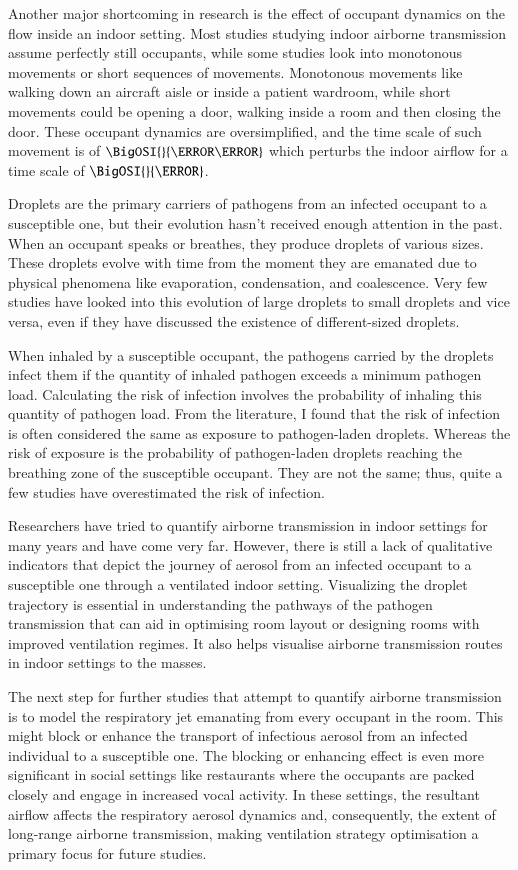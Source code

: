 \documentclass[a4paper,12pt]{elsarticle}
\begin{document}
Another major shortcoming in research is the effect of occupant dynamics on the flow inside an indoor setting. Most studies studying indoor airborne transmission assume perfectly still occupants, while some studies look into monotonous movements or short sequences of movements. Monotonous movements like walking down an aircraft aisle or inside a patient wardroom, while short movements could be opening a door, walking inside a room and then closing the door. These occupant dynamics are oversimplified, and the time scale of such movement is of $\BigOSI{}{\milli\second}$ which perturbs the indoor airflow for a time scale of $\BigOSI{}{\second}$.

Droplets are the primary carriers of pathogens from an infected occupant to a susceptible one, but their evolution hasn't received enough attention in the past. When an occupant speaks or breathes, they produce droplets of various sizes. These droplets evolve with time from the moment they are emanated due to physical phenomena like evaporation, condensation, and coalescence. Very few studies have looked into this evolution of large droplets to small droplets and vice versa, even if they have discussed the existence of different-sized droplets.

When inhaled by a susceptible occupant, the pathogens carried by the droplets infect them if the quantity of inhaled pathogen exceeds a minimum pathogen load. Calculating the risk of infection involves the probability of inhaling this quantity of pathogen load. From the literature, I found that the risk of infection is often considered the same as exposure to pathogen-laden droplets. Whereas the risk of exposure is the probability of pathogen-laden droplets reaching the breathing zone of the susceptible occupant. They are not the same; thus, quite a few studies have overestimated the risk of infection.

Researchers have tried to quantify airborne transmission in indoor settings for many years and have come very far. However, there is still a lack of qualitative indicators that depict the journey of aerosol from an infected occupant to a susceptible one through a ventilated indoor setting. Visualizing the droplet trajectory is essential in understanding the pathways of the pathogen transmission that can aid in optimising room layout or designing rooms with improved ventilation regimes. It also helps visualise airborne transmission routes in indoor settings to the masses.

The next step for further studies that attempt to quantify airborne transmission is to model the respiratory jet emanating from every occupant in the room. This might block or enhance the transport of infectious aerosol from an infected individual to a susceptible one. The blocking or enhancing effect is even more significant in social settings like restaurants where the occupants are packed closely and engage in increased vocal activity. In these settings, the resultant airflow affects the respiratory aerosol dynamics and, consequently, the extent of long-range airborne transmission, making ventilation strategy optimisation a primary focus for future studies.
\end{document}
